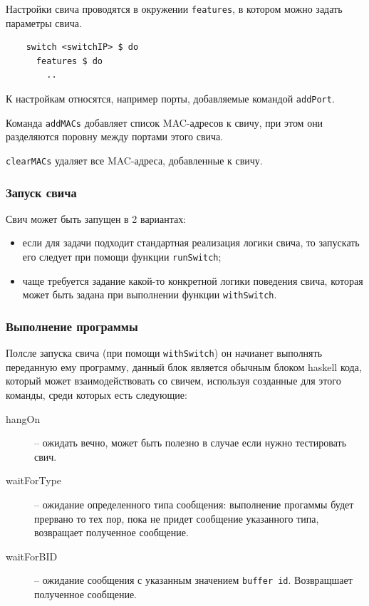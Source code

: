 \documentclass[9pt,a4paper]{article}
\begin{document}
Настройки свича проводятся в окружении \lstinline!features!, в котором можно задать
параметры свича.

\begin{lstlisting}
    switch <switchIP> $ do
      features $ do
        ..
\end{lstlisting}

К настройкам относятся, например порты, добавляемые командой \lstinline!addPort!.

Команда \lstinline!addMACs! добавляет список MAC-адресов к свичу, при этом они разделяются
поровну между портами этого свича.

\lstinline!clearMACs! удаляет все MAC-адреса, добавленные к свичу.


\subsubsection{Запуск свича}

Свич может быть запущен в 2 вариантах:

\begin{itemize}
  \item если для задачи подходит стандартная реализация логики свича, то запускать
    его следует при помощи функции \lstinline!runSwitch!;
  \item чаще требуется задание какой-то конкретной логики поведения свича, которая
    может быть задана при выполнении функции \lstinline!withSwitch!.
\end{itemize}


\subsubsection{Выполнение программы}
Полсле запуска свича (при помощи \lstinline!withSwitch!) он начианет выполнять
переданную ему программу, данный блок является обычным блоком haskell кода,
который может взаимодействовать со свичем, используя созданные для этого команды,
среди которых есть следующие:

\begin{description}
  \item[hangOn] -- ожидать вечно, может быть полезно в случае если нужно тестировать
свич.

  \item[waitForType] -- ожидание определенного типа сообщения: выполнение прогаммы
будет прервано то тех пор, пока не придет сообщение указанного типа, возвращает 
полученное сообщение.

  \item[waitForBID] -- ожидание сообщения с указанным значением \lstinline!buffer id!.
Возвращшает полученное сообщение.

\end{description}
\end{document}
